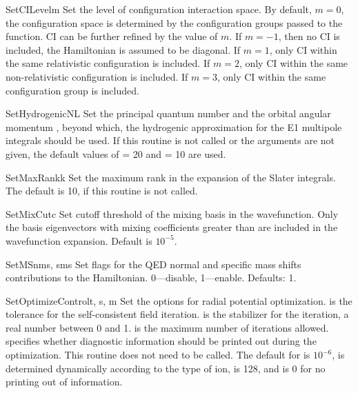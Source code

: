 \begin{fundesc}{SetCILevel}{m}
Set the level of configuration interaction space. By default, $m=0$, the
configuration space is determined by the configuration groups passed to the
 function. CI can be further refined by the value of $m$. If
$m=-1$, then no CI is included, the Hamiltonian is assumed to be diagonal. If
$m=1$, only CI within the same relativistic configuration is included. If
$m=2$, only CI within the same non-relativistic configuration is included. If
$m=3$, only CI within the same configuration group is included.
\end{fundesc}

\begin{fundesc}{SetHydrogenicNL}{}
Set the principal quantum number  and the orbital angular momentum
, beyond which, the hydrogenic approximation for the E1 multipole
integrals should be used. If this routine is not called or the arguments are not
given, the default values of  = 20 and  = 10 are used.
\end{fundesc}

\begin{fundesc}{SetMaxRank}{k}
Set the maximum rank in the expansion of the Slater integrals. The default is
10, if this routine is not called.
\end{fundesc}

\begin{fundesc}{SetMixCut}{c}
Set cutoff threshold of the mixing basis in the wavefunction. Only the basis
eigenvectors with mixing coefficients greater than  are included in the
wavefunction expansion. Default is $10^{-5}$.
\end{fundesc}

\begin{fundesc}{SetMS}{nms, sms}
Set flags for the QED normal and specific mass shifts contributions to the
Hamiltonian. 0---disable, 1---enable. Defaults: 1.
\end{fundesc}

\begin{fundesc}{SetOptimizeControl}{t, s, m}
Set the options for radial potential optimization.  is the tolerance for
the self-consistent field iteration.  is the stabilizer for the
iteration, a real number between 0 and 1.  is the maximum number of
iterations allowed.   specifies whether diagnostic information should be
printed out during the optimization. This routine does not need to be called.
The default for  is $10^{-6}$,  is determined dynamically
according to the type of ion,  is 128, and  is 0 for no printing
out of information.
\end{fundesc}

